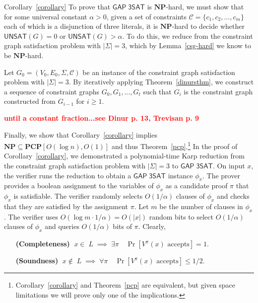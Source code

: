 \documentclass{article}
\newcommand{\fixme}[1] { \textcolor{red} {
{\fbox{ {\bf Fix:} \ensuremath{\blacktriangleright }} {\bf #1}
\fbox{\ensuremath{\blacktriangleleft} } } } }
\newenvironment{proof_of}[1]{\noindent {\bf Proof of #1:}
	\hspace*{1mm}}{\hspace*{\fill} $\Box$ }
\newcommand{\bits}{\{0,1\}}
\newcommand{\class}[1]{\mathbf{#1}}
\newcommand{\NP}{\class{NP}}
\newcommand{\PCP}{\class{PCP}}
\newcommand{\UNSAT}{\mathsf{UNSAT}}
\newcommand{\GAPSAT}{\mathsf{GAP\;3SAT}}
\begin{document}
\begin{proof_of}{Corollary~\ref{corollary}}
To prove that $\GAPSAT$ is $\NP$-hard, we must show that for some universal
constant $\alpha > 0$, given a set of constraints $\mathcal{C} = \{c_1, c_2, \dots, c_m\}$
each of which is a disjunction of three literals, it is $\NP$-hard to decide
whether $\UNSAT(G)=0$ or $\UNSAT(G)>\alpha$.
To do this, we reduce from the constraint graph satisfaction problem with
$|\Sigma| = 3$, which by Lemma~\ref{csg-hard} we know to be $\NP$-hard.

Let $G_0 = (V_0, E_0, \Sigma, \mathcal{C})$ be an instance of the constraint
graph satisfaction problem with $|\Sigma| = 3$.
By iteratively applying Theorem~\ref{dinursthm}, we construct a sequence
of constraint graphs $G_0, G_1, \dots, G_t$ such that $G_i$ is the constraint
graph constructed from $G_{i-1}$ for $i\ge 1$.

\fixme{until a constant fraction...see Dinur p. 13, Trevisan p. 9}
\end{proof_of}

Finally, we show that Corollary~\ref{corollary} implies $\NP \subseteq \PCP[O(\log n),O(1)]$
and thus Theorem~\ref{pcp}.\footnote{
Corollary~\ref{corollary} and Theorem~\ref{pcp} are equivalent, but given space limitations
we will prove only one of the implications.}
In the proof of Corollary~\ref{corollary}, we demonstrated a polynomial-time
Karp reduction from the constraint graph satisfaction problem with
$|\Sigma| = 3$ to $\GAPSAT$.
On input $x$, the verifier runs the reduction  to obtain a $\GAPSAT$
instance $\phi_x$.
The prover provides %
a boolean assignment to the variables of $\phi_x$ as a candidate proof $\pi$
that $\phi_x$ is satisfiable.
The verifier randomly selects $O(1/\alpha)$ clauses of $\phi_x$ and
checks that they are satisfied by the assignment $\pi$.
Let $m$ be the number of clauses in $\phi_x$.
The verifier uses $O(\log m \cdot 1/\alpha) = O(|x|)$ random bits
to select $O(1/\alpha)$ clauses of $\phi_x$ and queries
$O(1/\alpha)$ bits of $\pi$.
Clearly,
\begin{itemize}[leftmargin=10em]
\item[\textbf{(Completeness)}] $\;x \in\; L \;\implies\; \exists \pi \quad \Pr[V^\pi(x) \text{ accepts}] = 1$.
\item[\textbf{(Soundness)}] $\;x \notin\; L \;\implies\; \forall \pi \quad \Pr[V^\pi(x) \text{ accepts}] \le 1/2$.
\end{itemize}
\end{document}
